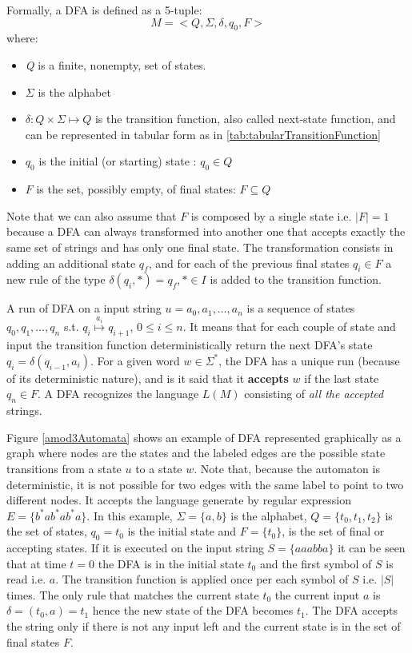 Formally, a DFA is defined as a 5-tuple:
\[M = <Q,\Sigma,\delta,q_0,F>\] 
where:
\begin{itemize}
  \item \textit{Q} is a finite, nonempty, set of states.
\item $\Sigma$ is the alphabet
\item $ \delta : Q \times \Sigma \longmapsto Q  $ is the
transition function, also called next-state function, and can be represented in
tabular form  as  in \ref{tab:tabularTransitionFunction}
\item $q_0 $ is the initial (or starting) state :
$ q_0 \in  Q $
\item  $F $ is the set, possibly empty, of final states:
$ F \subseteq Q $

\end{itemize}
Note that we can also assume that $F$ is composed by a single state i.e. $\left\vert{F}\right\vert=1$ because a DFA can always transformed into another one that accepts exactly the same set of strings and has only one final state. The transformation consists in adding an additional state $q_f$, and for each of the previous final states $q_i \in
F$ a new rule of the type $\delta(q_i,*)=q_f, * \in I $ is added to the transition function.

A run of DFA on a input string $u = a_0,a_1,\ldots,a_n$ is a
sequence of states  $ q_0,q_1,\ldots,q_n$ s.t.
$q_i  \overset{a_i}{\longmapsto} q_{i+1} $,
$ 0 \leq i \le n$. It means that for each couple of state
and input the transition function deterministically return the next DFA's
state  $q_i=\delta(q_{i-1},a_{i}) $.
For a given word $\textit{w}\in \Sigma^* $, the DFA has a
unique run (because of its deterministic nature), and is it said that it \textbf{accepts} $w$ if the last state $q_n \in F$. A DFA recognizes the
language $L(M)$ consisting of \textit{all the accepted} strings.

Figure \ref{amod3Automata} shows an example of DFA represented graphically as a graph where nodes are the states and the labeled edges are the possible state transitions from a state $u$ to a state $w$.
Note that, because the automaton is deterministic, it is not possible for two
edges with the same label to point to two different nodes.
It accepts the language  generate by regular expression $E=\{b^*ab^*ab^*a\}$.
In this example, $ \Sigma = \{a,b\}$ is the alphabet, $ Q = \{t_0,t_1,t_2\}$ is the set of states, $ q_0 = t_0$ is the initial state and $ F = \{t_0\} $, is the set of final or accepting states.
If it is  executed on the input string $S=\{aaabba\}$ it can be seen that at time
$t=0$ the DFA is in the initial state $t_0$ and the first
symbol of $S$ is read i.e. $a$.
The transition function is applied once per each symbol of $S$
i.e. $\left\vert{S}\right\vert$ times. The only rule that matches 
the current state $t_0$ the current input $a$ is $\delta=(t_0,a)=t_1 $ hence the new state of the DFA becomes $t_1$. 
The DFA accepts the string only if  there is not any input left and the current state is in the set of final states $F$.

